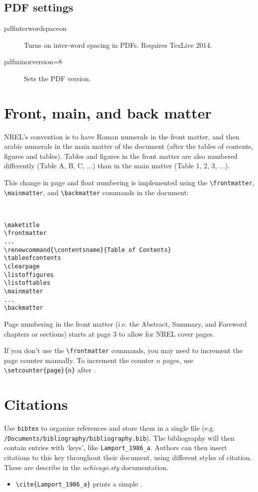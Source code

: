 \subsection{PDF settings}
\begin{description}
\item[pdfinterwordspaceon]{Turns on inter-word spacing in PDFs. Requires TexLive 2014.}
\item[pdfminorversion=8]{Sets the PDF version.}
\end{description}

\section{Front, main, and back matter}
NREL's convention is to have Roman numerals in the front matter, and then arabic numerals in the main matter of the document (after the tables of contents, figures and tables). Tables and figures in the front matter are also numbered differently (Table A, B, C, ...) than in the main matter (Table 1, 2, 3, ...).

This change in page and float numbering is implemented using the \verb+\frontmatter+, \verb+\mainmatter+, and \verb+\backmatter+ commands in the document:

\begin{verbatim}


\maketitle
\frontmatter
...
\renewcommand{\contentsname}{Table of Contents}
\tableofcontents
\clearpage
\listoffigures
\listoftables
\mainmatter
...
\backmatter

\end{verbatim}

Page numbering in the front matter (i.e. the Abstract, Summary, and Foreword chapters or sections) starts at page 3 to allow for NREL cover pages.

If you don't use the \verb+\frontmatter+ commands, you may need to increment the page counter manually. To increment the counter $n$ pages, use \verb+\setcounter{page}{n}+ after \verb++.

\section{Citations}
\label{Sec:Bib}
Use \texttt{bibtex} to organize references and store them in a single file (e.g. \verb+/Documents/bibliography/bibliography.bib+). The bibliography will then contain entries with `keys', like \texttt{Lamport\_1986\_a}. Authors can then insert citations to this key throughout their document, using different styles of citation. These are describe in the \emph{achicago.sty} documentation.
\begin{itemize}
\item \verb+\cite{Lamport_1986_a}+ prints a simple \cite{Lamport_1986_a}.
\end{itemize}

